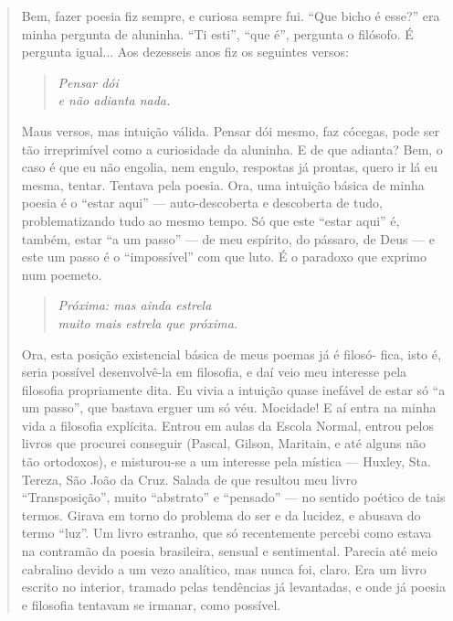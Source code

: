 \documentclass[12pt]{extarticle}
\begin{document}
\begin{enumerate}
\begin{quote}
Bem, fazer poesia fiz sempre, e curiosa sempre fui. ``Que bicho é
esse?'' era minha pergunta de aluninha. ``Ti esti'', ``que é'', pergunta
o filósofo. É pergunta igual... Aos dezesseis anos fiz os seguintes
versos:

\begin{verse}
\emph{Pensar dói}\\
\emph{e não adianta nada.}
\end{verse}

Maus versos, mas intuição válida. Pensar dói mesmo, faz cócegas, pode
ser tão irreprimível como a curiosidade da aluninha. E de que adianta?
Bem, o caso é que eu não engolia, nem engulo, respostas já prontas,
quero ir lá eu mesma, tentar. Tentava pela poesia. Ora, uma intuição
básica de minha poesia é o ``estar aqui'' --- auto-descoberta e
descoberta de tudo, problematizando tudo ao mesmo tempo. Só que este
``estar aqui'' é, também, estar ``a um passo'' --- de meu espírito, do
pássaro, de Deus --- e este um passo é o ``impossível'' com que luto. É
o paradoxo que exprimo num poemeto.

\begin{verse}
\emph{Próxima: mas ainda estrela}\\
\emph{muito mais estrela que próxima.}
\end{verse}

Ora, esta posição existencial básica de meus poemas já é filosó- fica,
isto é, seria possível desenvolvê-la em filosofia, e daí veio meu
interesse pela filosofia propriamente dita. Eu vivia a intuição quase
inefável de estar só ``a um passo'', que bastava erguer um só véu.
Mocidade! E aí entra na minha vida a filosofia explícita. Entrou em
aulas da Escola Normal, entrou pelos livros que procurei conseguir
(Pascal, Gilson, Maritain, e até alguns não tão ortodoxos), e
misturou-se a um interesse pela mística --- Huxley, Sta. Tereza, São
João da Cruz. Salada de que resultou meu livro ``Transposição'', muito
``abstrato'' e ``pensado'' --- no sentido poético de tais termos. Girava
em torno do problema do ser e da lucidez, e abusava do termo ``luz''. Um
livro estranho, que só recentemente percebi como estava na contramão da
poesia brasileira, sensual e sentimental. Parecia até meio cabralino
devido a um vezo analítico, mas nunca foi, claro. Era um livro escrito
no interior, tramado pelas tendências já levantadas, e onde já poesia e
filosofia tentavam se irmanar, como possível.


\end{quote}
\end{enumerate}
\end{document}
